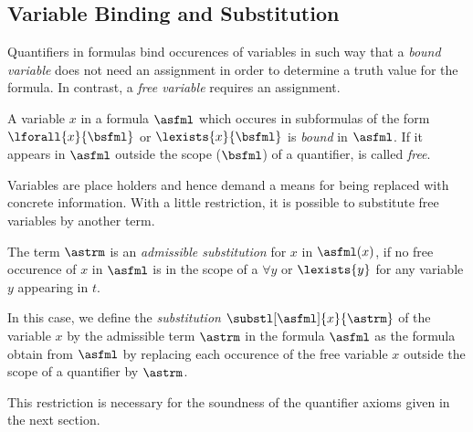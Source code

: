 
        \subsection{Variable Binding and Substitution}
            \label{sec:FOL-variable-binding}

            Quantifiers in formulas bind occurences of variables in such way that a \emph{bound variable} does not need an assignment in order to determine a truth value for the formula.
            In contrast, a \emph{free variable} requires an assignment.


            \begin{definition}
                A variable $x$ in a formula $\asfml$ which occures in subformulas of the form $\lforall{x}{\bsfml}$ or $\lexists{x}{\bsfml}$ is \emph{bound} in $\asfml$.
                If it appears in $\asfml$ outside the scope ($\bsfml$) of a quantifier, is called \emph{free}.
            \end{definition}

            Variables are place holders and hence demand a means for being replaced with concrete information. With a little restriction, it is possible to substitute free variables by another term.

            \begin{definition}
                The term $\astrm$ is an \emph{admissible substitution} for $x$ in $\asfml(x)$, if no free occurence of $x$ in $\asfml$ is in the scope of a $\forall{y}$ or $\lexists{y}$ for any variable $y$ appearing in $t$.

                In this case, we define the \emph{substitution} $\substl[\asfml]{x}{\astrm}$ of the variable $x$ by the admissible term $\astrm$ in the formula $\asfml$ as the formula obtain from $\asfml$ by replacing each occurence of the free variable $x$ outside the scope of a quantifier by $\astrm$.
            \end{definition}

            This restriction is necessary for the soundness of the quantifier axioms given in the next section.

